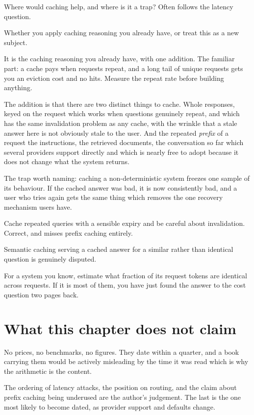 \begin{bankq}{Where would caching help, and where is it a trap?}
\qasked
Often follows the latency question.

\qtested
Whether you apply caching reasoning you already have, or treat this as a new
subject.

\qstaff
It is the caching reasoning you already have, with one addition. The familiar
part: a cache pays when requests repeat, and a long tail of unique requests
gets you an eviction cost and no hits. Measure the repeat rate before building
anything.

The addition is that there are two distinct things to cache. Whole responses,
keyed on the request \dash{} which works when questions genuinely repeat, and
which has the same invalidation problem as any cache, with the wrinkle that a
stale answer here is not obviously stale to the user. And the repeated
\emph{prefix} of a request \dash{} the instructions, the retrieved documents,
the conversation so far \dash{} which several providers support directly and
which is nearly free to adopt because it does not change what the system
returns.


The trap worth naming: caching a non-deterministic system freezes one sample of
its behaviour. If the cached answer was bad, it is now consistently bad, and a
user who tries again gets the same thing \dash{} which removes the one recovery
mechanism users have.

\qsenior
Cache repeated queries with a sensible expiry and be careful about
invalidation. Correct, and misses prefix caching entirely.

\qcontested
Semantic caching \dash{} serving a cached answer for a similar rather than
identical question \dash{} is genuinely disputed. 

\qdrill
For a system you know, estimate what fraction of its request tokens are
identical across requests. If it is most of them, you have just found the
answer to the cost question two pages back.
\end{bankq}

\section*{What this chapter does not claim}

No prices, no benchmarks, no figures. They date within a quarter, and a book
carrying them would be actively misleading by the time it was read \dash{}
which is why the arithmetic is the content.

The ordering of latency attacks, the position on routing, and the claim about
prefix caching being underused are the author's judgement. The last is the one
most likely to become dated, as provider support and defaults change.
